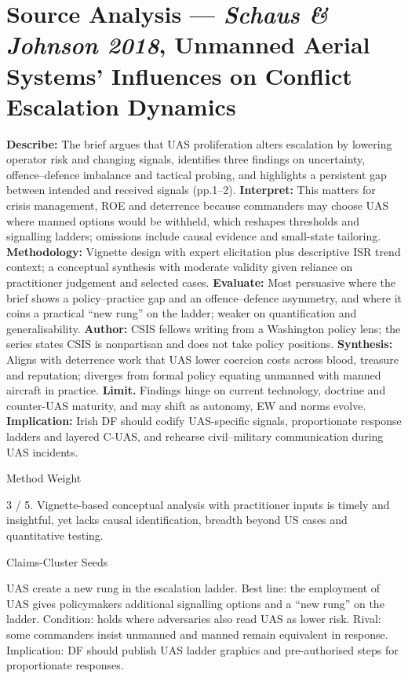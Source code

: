 \section*{Source Analysis — \textit{Schaus \& Johnson 2018}, Unmanned Aerial Systems’ Influences on Conflict Escalation Dynamics}
\textbf{Describe:} The brief argues that UAS proliferation alters escalation by lowering operator risk and changing signals, identifies three findings on uncertainty, offence–defence imbalance and tactical probing, and highlights a persistent gap between intended and received signals (pp.1–2).
\textbf{Interpret:} This matters for crisis management, ROE and deterrence because commanders may choose UAS where manned options would be withheld, which reshapes thresholds and signalling ladders; omissions include causal evidence and small-state tailoring.
\textbf{Methodology:} Vignette design with expert elicitation plus descriptive ISR trend context; a conceptual synthesis with moderate validity given reliance on practitioner judgement and selected cases.
\textbf{Evaluate:} Most persuasive where the brief shows a policy–practice gap and an offence–defence asymmetry, and where it coins a practical “new rung” on the ladder; weaker on quantification and generalisability.
\textbf{Author:} CSIS fellows writing from a Washington policy lens; the series states CSIS is nonpartisan and does not take policy positions.
\textbf{Synthesis:} Aligns with deterrence work that UAS lower coercion costs across blood, treasure and reputation; diverges from formal policy equating unmanned with manned aircraft in practice.
\textbf{Limit.} Findings hinge on current technology, doctrine and counter-UAS maturity, and may shift as autonomy, EW and norms evolve.
\textbf{Implication:} Irish DF should codify UAS-specific signals, proportionate response ladders and layered C-UAS, and rehearse civil–military communication during UAS incidents.

Method Weight

3 / 5. Vignette-based conceptual analysis with practitioner inputs is timely and insightful, yet lacks causal identification, breadth beyond US cases and quantitative testing.

Claims-Cluster Seeds

UAS create a new rung in the escalation ladder. Best line: the employment of UAS gives policymakers additional signalling options and a “new rung” on the ladder. Condition: holds where adversaries also read UAS as lower risk. Rival: some commanders insist unmanned and manned remain equivalent in response. Implication: DF should publish UAS ladder graphics and pre-authorised steps for proportionate responses.

